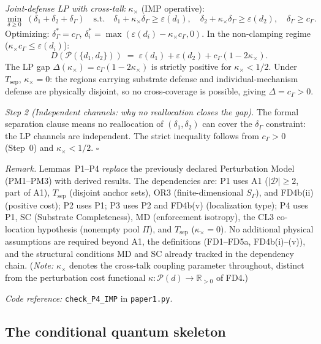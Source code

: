\documentclass[11pt]{article}
\theoremstyle{remark}
\newcommand{\coderef}[2]{\smallskip\noindent\textit{Code reference:} \texttt{#1} in \texttt{#2}.}
\begin{document}
\textit{Joint-defense LP with cross-talk $\kappa_\times$} (IMP operative):
\[
\min_{\delta \ge 0}\;(\delta_1 + \delta_2 + \delta_\Gamma)
\quad\text{s.t.}\quad
\delta_1 + \kappa_\times\delta_\Gamma \ge \varepsilon(d_1),\quad
\delta_2 + \kappa_\times\delta_\Gamma \ge \varepsilon(d_2),\quad
\delta_\Gamma \ge c_\Gamma.
\]
Optimizing: $\delta_\Gamma^* = c_\Gamma$, $\delta_i^* = \max(\varepsilon(d_i) - \kappa_\times c_\Gamma, 0)$.  In the non-clamping regime ($\kappa_\times c_\Gamma \le \varepsilon(d_i)$):
\[
D(\mathcal{P}(\{d_1,d_2\})) \;=\; \varepsilon(d_1) + \varepsilon(d_2) + c_\Gamma(1 - 2\kappa_\times).
\]
The LP gap $\Delta(\kappa_\times) = c_\Gamma(1-2\kappa_\times)$ is strictly positive for $\kappa_\times < 1/2$.  Under $T_{\mathrm{sep}}$, $\kappa_\times = 0$: the regions carrying substrate defense and individual-mechanism defense are physically disjoint, so no cross-coverage is possible, giving $\Delta = c_\Gamma > 0$.

\textit{Step 2 (Independent channels: why no reallocation closes the gap).}
The formal separation clause means no reallocation of $(\delta_1, \delta_2)$ can cover the $\delta_\Gamma$ constraint: the LP channels are independent.  The strict inequality follows from $c_\Gamma > 0$ (Step~0) and $\kappa_\times < 1/2$.  \hfill$\square$

\smallskip\noindent\textit{Remark.}  Lemmas~P1--P4 \emph{replace} the previously declared Perturbation Model (PM1--PM3) with derived results.  The dependencies are: P1 uses A1 ($|\mathcal{D}| \ge 2$, part of A1), $T_{\mathrm{sep}}$ (disjoint anchor sets), OR3 (finite-dimensional $S_\Gamma$), and FD4b(ii) (positive cost); P2 uses P1; P3 uses P2 and FD4b(v) (localization type); P4 uses P1, SC (Substrate Completeness), MD (enforcement isotropy), the CL3 co-location hypothesis (nonempty pool $\Pi$), and $T_{\mathrm{sep}}$ ($\kappa_\times = 0$).  No additional physical assumptions are required beyond A1, the definitions (FD1--FD5a, FD4b(i)--(v)), and the structural conditions MD and SC already tracked in the dependency chain.  (\emph{Note:} $\kappa_\times$ denotes the cross-talk coupling parameter throughout, distinct from the perturbation cost functional $\kappa: \mathcal{P}(d) \to \mathbb{R}_{>0}$ of FD4.)

\coderef{check\_P4\_IMP}{paper1.py}


\subsection{The conditional quantum skeleton}
\label{sec:conditional_skeleton}
\end{document}
